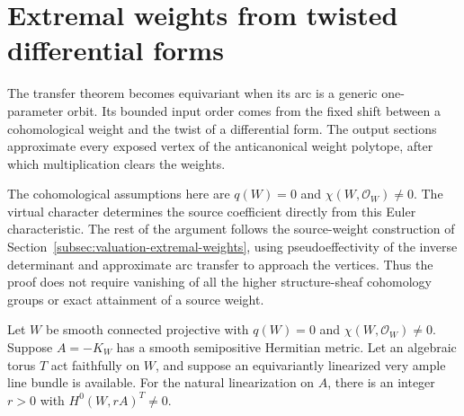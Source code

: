 \section{Extremal weights from twisted differential forms}
\label{V:sec-extremal}

The transfer theorem becomes equivariant when its arc is a generic
one-parameter orbit.  Its bounded input order comes from the fixed
shift between a cohomological weight and the twist of a differential
form.  The output sections approximate every exposed vertex of the
anticanonical weight polytope, after which multiplication clears the
weights.

The cohomological assumptions here are $q(W)=0$ and
$\chi(W,\mathcal O_W)\ne0$.  The virtual character determines the
source coefficient directly from this Euler characteristic.  The
rest of the argument follows the source-weight construction of
Section~\ref{subsec:valuation-extremal-weights}, using pseudoeffectivity of the
inverse determinant and approximate arc transfer to approach the
vertices.  Thus the proof does not require vanishing of all the higher
structure-sheaf cohomology groups or exact attainment of a source weight.

\begin{proposition}\label{V:extremal-invariants}
Let $W$ be smooth connected projective with $q(W)=0$ and
$\chi(W,\mathcal O_W)\ne0$.  Suppose $A=-K_W$ has a smooth
semipositive Hermitian metric.  Let an algebraic torus $T$ act
faithfully on $W$, and suppose an equivariantly linearized very ample
line bundle is available.  For the natural linearization on $A$,
there is an integer $r>0$ with $H^0(W,rA)^T\ne0$.
\end{proposition}

